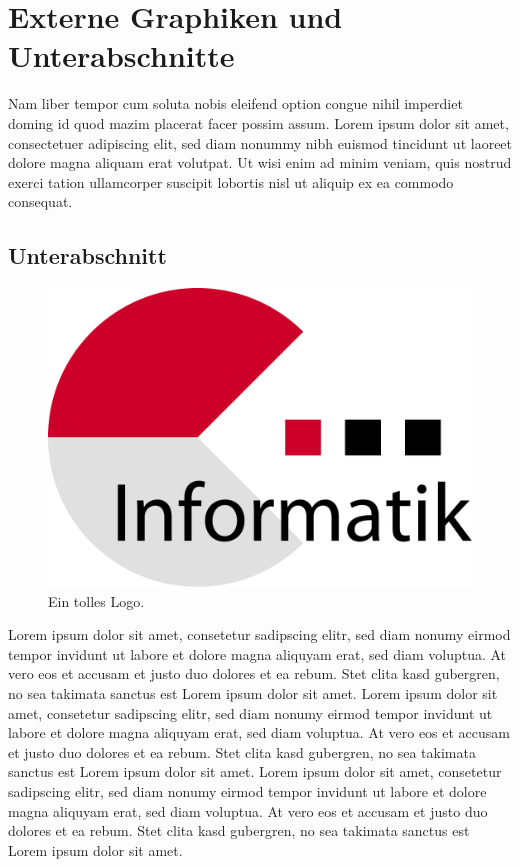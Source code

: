 \documentclass[12pt, a4paper, twoside, headsepline]{scrartcl}
\begin{document}
\section{Externe Graphiken und Unterabschnitte}

Nam liber tempor cum soluta nobis eleifend option congue nihil imperdiet doming id quod mazim placerat facer possim assum. Lorem ipsum dolor sit amet, consectetuer adipiscing elit, sed diam nonummy nibh euismod tincidunt ut laoreet dolore magna aliquam erat volutpat. Ut wisi enim ad minim veniam, quis nostrud exerci tation ullamcorper suscipit lobortis nisl ut aliquip ex ea commodo consequat. 

\subsection{Unterabschnitt}

\begin{figure}[h!]
 \centering
 \includegraphics[scale=0.5]{media/logo.pdf}
 \caption{Ein tolles Logo.}
\end{figure}

Lorem ipsum dolor sit amet, consetetur sadipscing elitr, sed diam nonumy eirmod tempor invidunt ut labore et dolore magna aliquyam erat, sed diam voluptua. At vero eos et accusam et justo duo dolores et ea rebum. Stet clita kasd gubergren, no sea takimata sanctus est Lorem ipsum dolor sit amet. Lorem ipsum dolor sit amet, consetetur sadipscing elitr, sed diam nonumy eirmod tempor invidunt ut labore et dolore magna aliquyam erat, sed diam voluptua. At vero eos et accusam et justo duo dolores et ea rebum. Stet clita kasd gubergren, no sea takimata sanctus est Lorem ipsum dolor sit amet. Lorem ipsum dolor sit amet, consetetur sadipscing elitr, sed diam nonumy eirmod tempor invidunt ut labore et dolore magna aliquyam erat, sed diam voluptua. At vero eos et accusam et justo duo dolores et ea rebum. Stet clita kasd gubergren, no sea takimata sanctus est Lorem ipsum dolor sit amet. 
\end{document}
